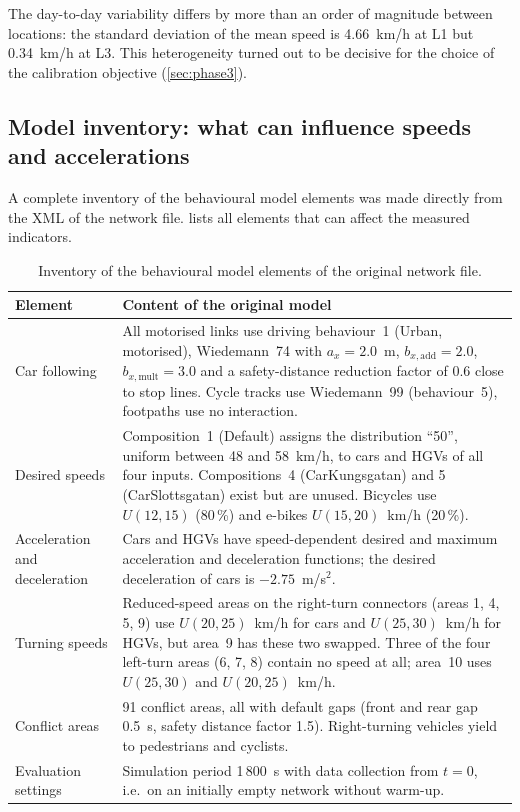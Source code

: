 \documentclass[11pt,a4paper]{article}
\newcommand{\kmh}{~km/h}
\newcommand{\mss}{~m/s$^2$}
\begin{document}
The day-to-day variability differs by more than an order of magnitude between locations: the
standard deviation of the mean speed is 4.66\kmh{} at L1 but 0.34\kmh{} at L3. This heterogeneity
turned out to be decisive for the choice of the calibration objective (\cref{sec:phase3}).

\subsection{Model inventory: what can influence speeds and accelerations}
\label{sec:inventory}

A complete inventory of the behavioural model elements was made directly from the XML of the
network file.  lists all elements that can affect the measured indicators.

\begin{table}[!htb]
\centering
\caption[Inventory of behavioural model elements]{Inventory of the behavioural model elements of
the original network file.}
\label{tab:inventory}
\small
\begin{tabularx}{\textwidth}{>{\raggedright\arraybackslash}p{3.1cm}X}
\toprule
\textbf{Element} & \textbf{Content of the original model}\\
\midrule
Car following &
All motorised links use driving behaviour~1 (Urban, motorised), Wiedemann~74 with
$a_x = 2.0$~m, $b_{x,\mathrm{add}} = 2.0$, $b_{x,\mathrm{mult}} = 3.0$ and a safety-distance
reduction factor of 0.6 close to stop lines. Cycle tracks use Wiedemann~99 (behaviour~5),
footpaths use no interaction.\\
Desired speeds &
Composition~1 (Default) assigns the distribution ``50'', uniform between 48 and 58\kmh, to cars
and HGVs of all four inputs. Compositions~4 (CarKungsgatan) and 5 (CarSlottsgatan) exist but are
unused. Bicycles use $U(12,15)$ (80\,\%) and e-bikes $U(15,20)$\kmh{} (20\,\%).\\
Acceleration and deceleration &
Cars and HGVs have speed-dependent desired and maximum acceleration and deceleration functions;
the desired deceleration of cars is $-2.75$\mss.\\
Turning speeds &
Reduced-speed areas on the right-turn connectors (areas 1, 4, 5, 9) use $U(20,25)$\kmh{} for cars
and $U(25,30)$\kmh{} for HGVs, but area~9 has these two swapped. Three of the four left-turn areas
(6, 7, 8) contain no speed at all; area~10 uses $U(25,30)$ and $U(20,25)$\kmh.\\
Conflict areas &
91 conflict areas, all with default gaps (front and rear gap 0.5~s, safety distance factor 1.5).
Right-turning vehicles yield to pedestrians and cyclists.\\
Evaluation settings &
Simulation period 1\,800~s with data collection from $t = 0$, i.e.\ on an initially empty network
without warm-up.\\
\bottomrule
\end{tabularx}
\end{table}
\end{document}
